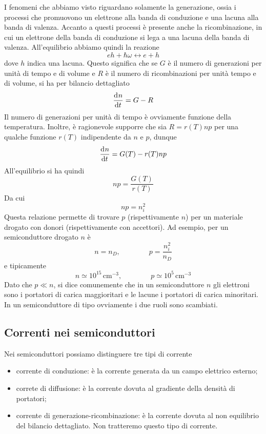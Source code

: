\documentclass[a4paper, 11pt]{article}
\begin{document}
	I fenomeni che abbiamo visto riguardano solamente la generazione, ossia i processi che promuovono un elettrone alla banda di conduzione e una lacuna alla banda di valenza. Accanto a questi processi è presente anche la ricombinazione, in cui un elettrone della banda di conduzione si lega a una lacuna della banda di valenza. All'equilibrio abbiamo quindi la reazione
	\[{eh}+\hbar\omega\leftrightarrow{e}+{h}\]
	dove $h$ indica una lacuna. Questo significa che se $G$ è il numero di generazioni per unità di tempo e di volume e $R$ è il numero di ricombinazioni per unità tempo e di volume, si ha per bilancio dettagliato
	\[\dfrac{\mathrm{d} ^{}n}{\mathrm{d} {t}^{}}=G-R\]
	Il numero di generazioni per unità di tempo è ovviamente funzione della temperatura. Inoltre, è ragionevole supporre che sia $R=r(T)np$ per una qualche funzione $r(T)$ indipendente da $n$ e $p$, dunque
	\[\dfrac{\mathrm{d} ^{}n}{\mathrm{d} {t}^{}}=G(T)-r(T)np\]
	All'equilibrio si ha quindi
	\[np=\frac{G(T)}{r(T)}\]
	Da cui
	\[np=n_i^2\]
	Questa relazione permette di trovare $p$ (rispettivamente $n$) per un materiale drogato con donori (rispettivamente con accettori). Ad esempio, per un semiconduttore drogato $n$ è
	\[n=n_D,\qquad\qquad p=\frac{n_i^2}{n_D}\]
	e tipicamente
	\[n\simeq 10^{15}\,\mathrm{cm}^{-3},\qquad\qquad p\simeq 10^5\,\mathrm{cm}^{-3}\]
	Dato che $p\ll n$, si dice comunemente che in un semiconduttore $n$ gli elettroni sono i portatori di carica maggioritari e le lacune i portatori di carica minoritari. In un semiconduttore di tipo ovviamente i due ruoli sono scambiati.
	\subsection{Correnti nei semiconduttori}
	Nei semiconduttori possiamo distinguere tre tipi di corrente
	\begin{itemize}
		\item corrente di conduzione: è la corrente generata da un campo elettrico esterno;
		\item correte di diffusione: è la corrente dovuta al gradiente della densità di portatori;
		\item corrente di generazione-ricombinazione: è la corrente dovuta al non equilibrio del bilancio dettagliato. Non tratteremo questo tipo di corrente.
	\end{itemize}
\end{document}
